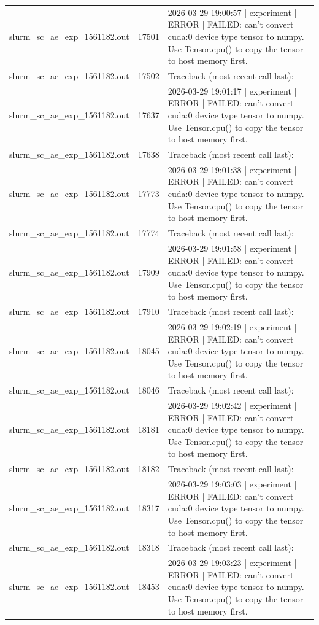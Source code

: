 \begin{tabular}{lrl}
slurm\_sc\_ae\_exp\_1561182.out & 17501 & 2026-03-29 19:00:57 | experiment | ERROR |   FAILED: can't convert cuda:0 device type tensor to numpy. Use Tensor.cpu() to copy the tensor to host memory first. \\
slurm\_sc\_ae\_exp\_1561182.out & 17502 & Traceback (most recent call last): \\
slurm\_sc\_ae\_exp\_1561182.out & 17637 & 2026-03-29 19:01:17 | experiment | ERROR |   FAILED: can't convert cuda:0 device type tensor to numpy. Use Tensor.cpu() to copy the tensor to host memory first. \\
slurm\_sc\_ae\_exp\_1561182.out & 17638 & Traceback (most recent call last): \\
slurm\_sc\_ae\_exp\_1561182.out & 17773 & 2026-03-29 19:01:38 | experiment | ERROR |   FAILED: can't convert cuda:0 device type tensor to numpy. Use Tensor.cpu() to copy the tensor to host memory first. \\
slurm\_sc\_ae\_exp\_1561182.out & 17774 & Traceback (most recent call last): \\
slurm\_sc\_ae\_exp\_1561182.out & 17909 & 2026-03-29 19:01:58 | experiment | ERROR |   FAILED: can't convert cuda:0 device type tensor to numpy. Use Tensor.cpu() to copy the tensor to host memory first. \\
slurm\_sc\_ae\_exp\_1561182.out & 17910 & Traceback (most recent call last): \\
slurm\_sc\_ae\_exp\_1561182.out & 18045 & 2026-03-29 19:02:19 | experiment | ERROR |   FAILED: can't convert cuda:0 device type tensor to numpy. Use Tensor.cpu() to copy the tensor to host memory first. \\
slurm\_sc\_ae\_exp\_1561182.out & 18046 & Traceback (most recent call last): \\
slurm\_sc\_ae\_exp\_1561182.out & 18181 & 2026-03-29 19:02:42 | experiment | ERROR |   FAILED: can't convert cuda:0 device type tensor to numpy. Use Tensor.cpu() to copy the tensor to host memory first. \\
slurm\_sc\_ae\_exp\_1561182.out & 18182 & Traceback (most recent call last): \\
slurm\_sc\_ae\_exp\_1561182.out & 18317 & 2026-03-29 19:03:03 | experiment | ERROR |   FAILED: can't convert cuda:0 device type tensor to numpy. Use Tensor.cpu() to copy the tensor to host memory first. \\
slurm\_sc\_ae\_exp\_1561182.out & 18318 & Traceback (most recent call last): \\
slurm\_sc\_ae\_exp\_1561182.out & 18453 & 2026-03-29 19:03:23 | experiment | ERROR |   FAILED: can't convert cuda:0 device type tensor to numpy. Use Tensor.cpu() to copy the tensor to host memory first. \\

\end{tabular}
